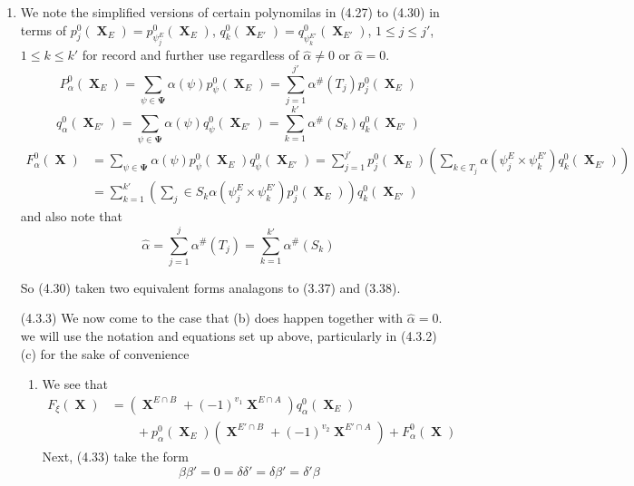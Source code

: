 \documentclass[a4paper,12pt]{article}
\DeclareMathOperator{\x}{\mathrm{X}}
\theoremstyle{definition}
\theoremstyle{underlinethm}
\theoremstyle{definition}
\begin{document}
\begin{enumerate}[label=(\alph*)]
\item We note the simplified versions of certain polynomilas in (4.27) to (4.30) in terms of $p_{j}^{0}(\boldsymbol{\x}_{E})=p_{\psi^{E}_{j}}^{0}(\boldsymbol{\x}_{E})$, $q_{k}^{0}(\boldsymbol{\x}_{E'}) = q_{\psi^{E'}_{k}}^{0}(\boldsymbol{\x}_{E'})$, $1 \leq j \leq j'$, $1 \leq k \leq k'$ for record and further use regardless of $\hat{\alpha} \neq  0$ or $\hat{\alpha}=0$. 
\begin{equation}
P_{\alpha}^{0}(\boldsymbol{\x}_{E}) = \sum_{\psi \in \boldsymbol{\Psi}} \alpha (\psi) p_{\psi}^{0}(\boldsymbol{\x}_{E}) = \sum_{j=1}^{j'} \alpha^{\#} (T_{j}) p_{j}^{0}(\boldsymbol{\x}_{E})\tag{4.31}\label{eq-4.31}
\end{equation}
\begin{equation}
q_{\alpha}^{0}(\boldsymbol{\x}_{E'}) = \sum_{\psi \in \boldsymbol{\Psi}} \alpha(\psi) q_{\psi}^{0}(\boldsymbol{\x}_{E'}) =\sum_{k=1}^{k'} \alpha^{\#}(S_{k}) q_{k}^{0} (\boldsymbol{\x}_{E'})\tag{4.32}\label{eq-4.32}
\end{equation}
\begin{align*}
F_{\alpha}^{0}(\boldsymbol{\x}) &= \sum_{\psi \in \boldsymbol{\Psi}}\alpha (\psi) p_{\psi}^{0}(\boldsymbol{\x}_{E}) q_{\psi}^{0}(\boldsymbol{\x}_{E'}) = \sum_{j=1}^{j'} p_{j}^{0}(\boldsymbol{\x}_{E}) \left(\sum_{k \in T_{j}} \alpha(\psi_{j}^{E} \times \psi_{k}^{E'}) q_{k}^{0}(\boldsymbol{\x}_{E'})\right)\\
& = \sum_{k=1}^{k'} \left(\sum_{j} \in S_{k} \alpha (\psi_{j}^{E} \times \psi_{k}^{E'}) p_{j}^{0} (\boldsymbol{\x}_{E})\right) q_{k}^{0}(\boldsymbol{\x}_{E'})\tag{4.33}\label{eq-4.33}
\end{align*} 
and also note that
\begin{equation}
\hat{\alpha} = \sum_{j=1}^{j} \alpha^{\#}(T_{j}) = \sum_{k=1}^{k'} \alpha^{\#}(S_{k})\tag{4.34}\label{eq-4.34}
\end{equation}

So (4.30) taken two equivalent forms analagons to (3.37) and (3.38).

(4.3.3) We now come to the case that (b) does happen together with $\hat{\alpha} =0$. we will use the notation and equations set up above, particularly in (4.3.2) (c) for the sake of convenience 
\begin{enumerate}[label=(\alph*)]
\item We see that
\begin{align*}
F_{\xi}(\boldsymbol{\x})& = \left(\boldsymbol{\x}^{E \cap B}  + (-1)^{v_{1}} \boldsymbol{\x}^{E \cap A}\right) q_{\alpha}^{0} (\boldsymbol{\x}_{E})\\
 &\qquad + p_{\alpha}^{0} (\boldsymbol{\x}_{E}) (\boldsymbol{\x}^{E' \cap B} + (-1)^{v_{2}} \boldsymbol{\x}^{E' \cap A}) + F_{\alpha}^{0}(\boldsymbol{\x})\tag{4.35}\label{eq-4.35}
\end{align*}
 Next, (4.33) take the form
 \begin{equation}
 \beta\beta' = 0 = \delta\delta' = \delta \beta' = \delta'\beta\tag{4.36}\label{eq-4.36}
 \end{equation}


\end{enumerate}
\end{enumerate}
\end{document}

